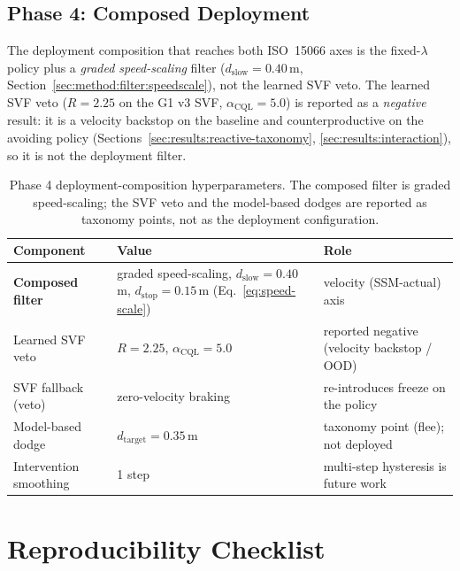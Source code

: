 \documentclass[11pt,a4paper]{report}
\newcommand{\ssm}{SSM}
\newcommand{\iso}{ISO~15066}
\begin{document}
\section{Phase 4: Composed Deployment}
\label{app:hparams:hybrid}

The deployment composition that reaches both \iso{} axes is the
fixed-$\lambda$ policy plus a \emph{graded speed-scaling} filter
($d_{\mathrm{slow}} = 0.40$\,m,
Section~\ref{sec:method:filter:speedscale}), not the learned SVF
veto. The learned
SVF veto ($R = 2.25$ on the G1 v3 SVF, $\alpha_{\mathrm{CQL}} = 5.0$)
is reported as a \emph{negative} result: it is a velocity backstop on
the baseline and counterproductive on the avoiding policy
(Sections~\ref{sec:results:reactive-taxonomy},
\ref{sec:results:interaction}), so it is not the deployment filter.

\begin{table}[h]
\centering
\small
\caption{Phase 4 deployment-composition hyperparameters. The
composed filter is graded speed-scaling; the SVF veto and the
model-based dodges are reported as taxonomy points, not as the
deployment configuration.}
\label{tab:app-hparams-hybrid}
\begin{tabular}{lll}
\toprule
Component & Value & Role \\
\midrule
\textbf{Composed filter} & graded speed-scaling, $d_{\mathrm{slow}} = 0.40$\,m, $d_{\mathrm{stop}} = 0.15$\,m (Eq.~\ref{eq:speed-scale}) & velocity (\ssm{}-actual) axis \\
Learned SVF veto & $R = 2.25$, $\alpha_{\mathrm{CQL}} = 5.0$ & reported negative (velocity backstop / OOD) \\
SVF fallback (veto) & zero-velocity braking & re-introduces freeze on the policy \\
Model-based dodge & $d_{\mathrm{target}} = 0.35$\,m & taxonomy point (flee); not deployed \\
Intervention smoothing & 1 step & multi-step hysteresis is future work \\
\bottomrule
\end{tabular}
\end{table}

\chapter{Reproducibility Checklist}
\label{app:repro}
\end{document}
